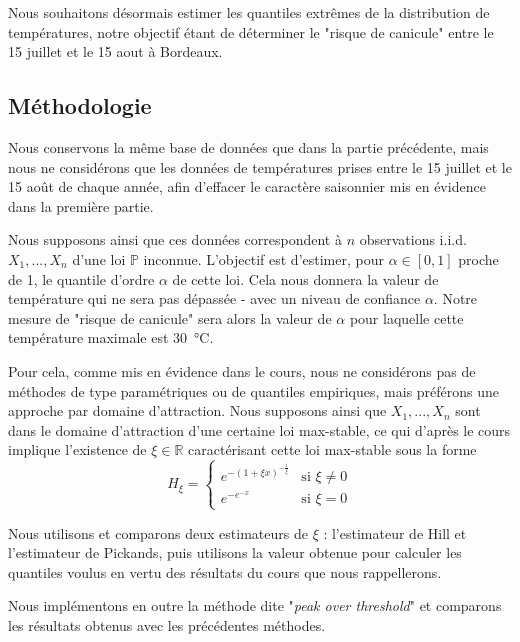 \documentclass[../report.tex]{subfiles}
\begin{document}
\par Nous souhaitons désormais estimer les quantiles extrêmes de la distribution de températures, notre objectif étant de déterminer le "risque de canicule" entre le 15 juillet et le 15 aout à Bordeaux.


\subsection{Méthodologie}

\par Nous conservons la même base de données que dans la partie précédente, mais nous ne considérons que les données de températures prises entre le 15 juillet et le 15 août de chaque année, afin d'effacer le caractère saisonnier mis en évidence dans la première partie.

\par Nous supposons ainsi que ces données correspondent à $n$ observations i.i.d. $X_1, ..., X_n$ d'une loi $\mathbb{P}$ inconnue. L'objectif est d'estimer, pour $\alpha \in \left[0, 1 \right]$ proche de 1, le quantile d'ordre $\alpha$ de cette loi. Cela nous donnera la valeur de température qui ne sera pas dépassée - avec un niveau de confiance $\alpha$. Notre mesure de "risque de canicule" sera alors la valeur de $\alpha$ pour laquelle cette température maximale est \SI{30}{\celsius}.

\par Pour cela, comme mis en évidence dans le cours, nous ne considérons pas de méthodes de type paramétriques ou de quantiles empiriques, mais préférons une approche par domaine d'attraction. Nous supposons ainsi que $X_1, ..., X_n$ sont dans le domaine d'attraction d'une certaine loi max-stable, ce qui d'après le cours implique l'existence de $\xi \in \mathbb{R}$ caractérisant cette loi max-stable sous la forme
\begin{displaymath}
H_{\xi} = 
	\begin{cases}
	e^{- {\left( 1 + \xi x \right)}^{-\frac{1}{\xi}}} &\text{si } \xi \neq 0 \\
	e^{-e^{-x}} &\text{si } \xi = 0
	\end{cases}
\end{displaymath}

\par Nous utilisons et comparons deux estimateurs de $\xi$ : l'estimateur de Hill et l'estimateur de Pickands, puis utilisons la valeur obtenue pour calculer les quantiles voulus en vertu des résultats du cours que nous rappellerons.
\par Nous implémentons en outre la méthode dite "\emph{peak over threshold}" et comparons les résultats obtenus avec les précédentes méthodes.
\end{document}

